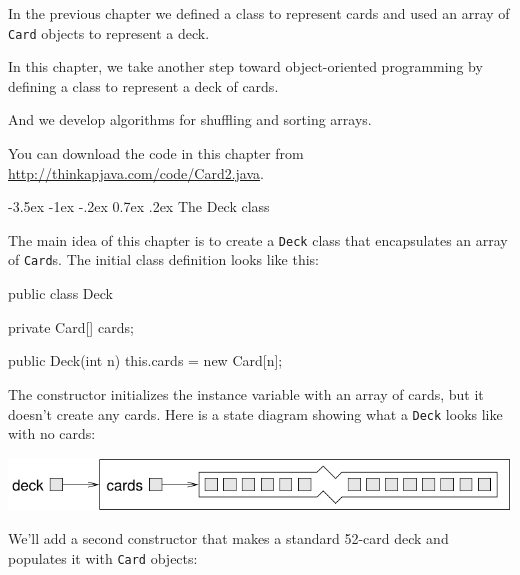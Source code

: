 \documentclass[12pt]{book}
\makeatletter
\theoremstyle{exercise}
\newcommand{\java}[1]{\verb"#1"}
\renewcommand{\section}{\@startsection{section}{1}{\z@}%
    {-3.5ex \@plus -1ex \@minus -.2ex}%
    {0.7ex \@plus.2ex}%
    {\normalfont\Large\bfseries}}
\newcommand{\java}[1]{\lstinline{#1}} %
\makeatother
\begin{document}
In the previous chapter we defined a class to represent cards and used an array of \java{Card} objects to represent a deck.

In this chapter, we take another step toward object-oriented programming by defining a class to represent a deck of cards.

And we develop algorithms for shuffling and sorting arrays.



You can download the code in this chapter from \url{http://thinkapjava.com/code/Card2.java}.


\section{The Deck class}
\label{deck}

The main idea of this chapter is to create a \java{Deck} class that encapsulates an array of \java{Card}s.
The initial class definition looks like this:

\begin{code}
public class Deck {
    private Card[] cards;

    public Deck(int n) {
        this.cards = new Card[n];
    }
}
\end{code}


The constructor initializes the instance variable with an array of cards, but it doesn't create any cards.
Here is a state diagram showing what a \java{Deck} looks like with no cards:

\begin{center}
\includegraphics{figs/deckobject.pdf}
\end{center}

We'll add a second constructor that makes a standard 52-card deck and populates it with \java{Card} objects:
\end{document}
